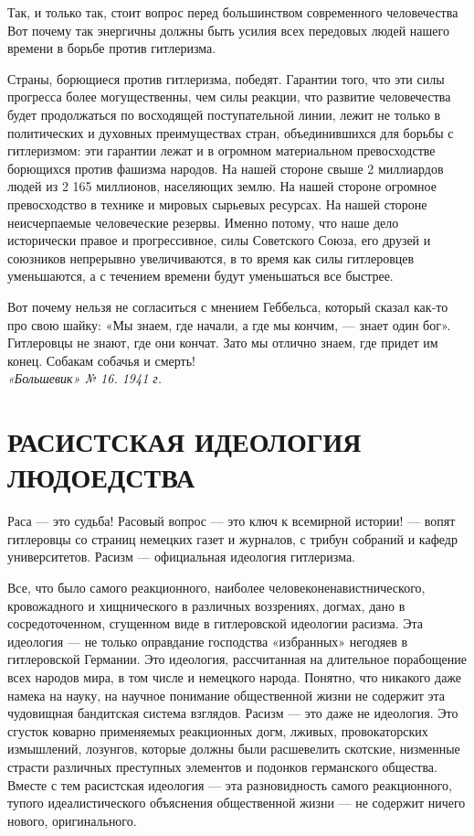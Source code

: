 \documentclass[12pt, a4paper, openany]{book}
\begin{document}
Так, и только так, стоит вопрос перед большинством современного человечества Вот почему так энергичны должны быть усилия всех передовых людей нашего времени в борьбе против гитлеризма.

Страны, борющиеся против гитлеризма, победят. Гарантии того, что эти силы прогресса более могущественны, чем силы реакции, что развитие человечества будет продолжаться по восходящей поступательной линии, лежит не только в политических и духовных преимуществах стран, объединившихся для борьбы с гитлеризмом: эти гарантии лежат и в огромном материальном превосходстве борющихся против фашизма народов. На нашей стороне свыше 2 миллиардов людей из 2 165 миллионов, населяющих землю. На нашей стороне огромное превосходство в технике и мировых сырьевых ресурсах. На нашей стороне неисчерпаемые человеческие резервы. Именно потому, что наше дело исторически правое и прогрессивное, силы Советского Союза, его друзей и союзников непрерывно увеличиваются, в то время как силы гитлеровцев уменьшаются, а с течением времени будут уменьшаться все быстрее.

Вот почему нельзя не согласиться с мнением Геббельса, который сказал как-то про свою шайку: «Мы знаем, где начали, а где мы кончим, — знает один бог». Гитлеровцы не знают, где они кончат. Зато мы отлично знаем, где придет им конец. Собакам собачья и смерть!
\ \\

\noindent\textit{«Большевик» № 16. 1941 г.}

\newpage

\section[Расистская идеология людоедства]{\center \textbf{РАСИСТСКАЯ ИДЕОЛОГИЯ ЛЮДОЕДСТВА}}	


Раса — это судьба! Расовый вопрос — это ключ к всемирной истории! — вопят гитлеровцы со страниц немецких газет и журналов, с трибун собраний и кафедр университетов. Расизм — официальная идеология гитлеризма.

Все, что было самого реакционного, наиболее человеконенавистнического, кровожадного и хищнического в различных воззрениях, догмах, дано в сосредоточенном, сгущенном виде в гитлеровской идеологии расизма. Эта идеология — не только оправдание господства «избранных» негодяев в гитлеровской Германии. Это идеология, рассчитанная на длительное порабощение всех народов мира, в том числе и немецкого народа. Понятно, что никакого даже намека на науку, на научное понимание общественной жизни не содержит эта чудовищная бандитская система взглядов. Расизм — это даже не идеология. Это сгусток коварно применяемых реакционных догм, лживых, провокаторских измышлений, лозунгов, которые должны были расшевелить скотские, низменные страсти различных преступных элементов и подонков германского общества. Вместе с тем расистская идеология — эта разновидность самого реакционного, тупого идеалистического объяснения общественной жизни — не содержит ничего нового, оригинального.
\end{document}

